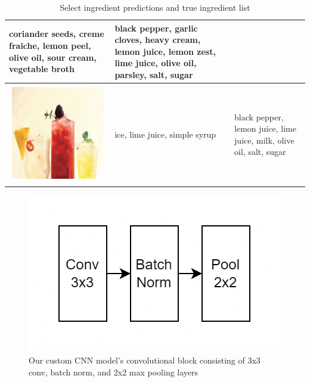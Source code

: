 \documentclass[10pt,twocolumn,letterpaper]{article}
\begin{document}
\begin{table}
\begin{tabular}{|p{5cm}|p{5cm}|p{5cm}|}
        coriander seeds, creme fraiche, lemon peel, olive oil, sour cream, vegetable broth &
        black pepper, garlic cloves, heavy cream, lemon juice, lemon zest, lime juice, olive oil, parsley, salt, sugar \\
        \hline
        \includegraphics[width=1\linewidth]{pred-3.png} & 
        ice, lime juice, simple syrup &
        black pepper, lemon juice, lime juice, milk, olive oil, salt, sugar \\
        \hline
    \end{tabular}
    \caption{Select ingredient predictions and true ingredient list}
    \label{tab:contributions}
\end{table}


\begin{figure}[ht]
\begin{center}
   \includegraphics[width=0.8\linewidth]{conv-block.drawio.png}
\end{center}
\caption{Our custom CNN model's convolutional block consisting of 3x3 conv, batch norm, and 2x2 max pooling layers}
\label{fig:onecol}
\end{figure}
\end{document}
